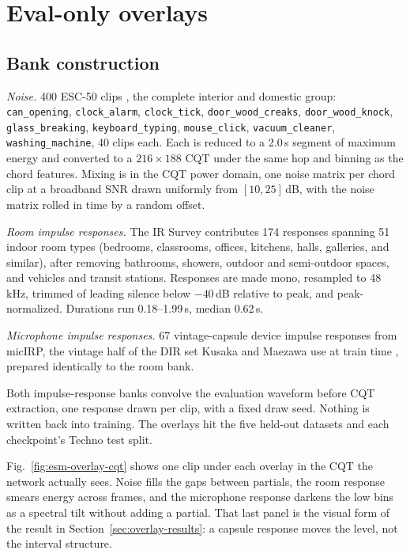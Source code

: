 \documentclass[pdflatex,sn-mathphys-num]{sn-jnl}
\begin{document}
\section{Eval-only overlays}\label{sec:overlays}

\subsection{Bank construction}\label{sec:banks}

\emph{Noise.} 400 ESC-50 clips \cite{Piczak2015}, the complete interior and domestic group: \texttt{can\_opening}, \texttt{clock\_alarm}, \texttt{clock\_tick}, \texttt{door\_wood\_creaks}, \texttt{door\_wood\_knock}, \texttt{glass\_breaking}, \texttt{keyboard\_typing}, \texttt{mouse\_click}, \texttt{vacuum\_cleaner}, \texttt{washing\_machine}, 40 clips each. Each is reduced to a 2.0\,s segment of maximum energy and converted to a $216\times188$ CQT under the same hop and binning as the chord features. Mixing is in the CQT power domain, one noise matrix per chord clip at a broadband SNR drawn uniformly from $[10,25]$\,dB, with the noise matrix rolled in time by a random offset.

\emph{Room impulse responses.} The IR Survey \cite{Traer2016} contributes 174 responses spanning 51 indoor room types (bedrooms, classrooms, offices, kitchens, halls, galleries, and similar), after removing bathrooms, showers, outdoor and semi-outdoor spaces, and vehicles and transit stations. Responses are made mono, resampled to 48\,kHz, trimmed of leading silence below $-40$\,dB relative to peak, and peak-normalized. Durations run 0.18--1.99\,s, median 0.62\,s.

\emph{Microphone impulse responses.} 67 vintage-capsule device impulse responses from micIRP, the vintage half of the DIR set Kusaka and Maezawa use at train time \cite{Kusaka2024}, prepared identically to the room bank.

Both impulse-response banks convolve the evaluation waveform before CQT extraction, one response drawn per clip, with a fixed draw seed. Nothing is written back into training. The overlays hit the five held-out datasets and each checkpoint's Techno test split.

Fig.~\ref{fig:esm-overlay-cqt} shows one clip under each overlay in the CQT the network actually sees. Noise fills the gaps between partials, the room response smears energy across frames, and the microphone response darkens the low bins as a spectral tilt without adding a partial. That last panel is the visual form of the result in Section~\ref{sec:overlay-results}: a capsule response moves the level, not the interval structure.
\end{document}
